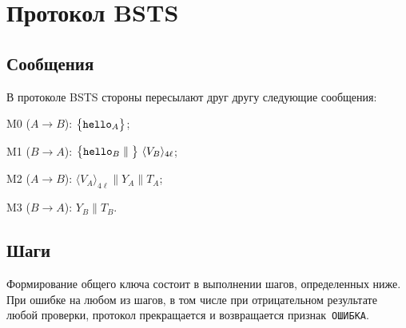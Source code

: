 \section{Протокол BSTS}\label{STS}

\subsection{Сообщения}\label{STS.Messages}

В протоколе BSTS
стороны пересылают друг другу следующие сообщения:

M0 ($A\to B$): 
$\mathbf{\bigl\{}\texttt{hello}_A\mathbf{\bigr\}}$;

M1 ($B\to A$): 
$\mathimplicit{\hello_B\parallel}\ 
\langle V_B\rangle_{4\ell}$;

M2 ($A\to B$): 
$\langle V_A\rangle_{4\ell}\parallel Y_A\parallel T_A$;

M3 ($B\to A$): 
$Y_B\parallel T_B$.

\subsection{Шаги}\label{STS.Steps}

Формирование общего ключа состоит в выполнении шагов, определенных ниже. При
ошибке на любом из шагов, в том числе при отрицательном результате любой
проверки, протокол прекращается и возвращается признак~\texttt{ОШИБКА}.


